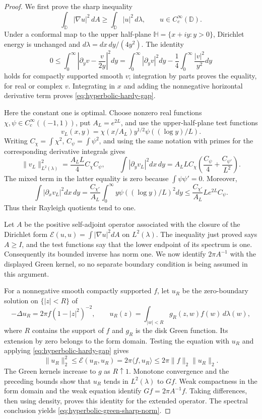\documentclass[11pt,a4paper]{article}
\numberwithin{equation}{section}
\theoremstyle{definition}
\theoremstyle{remark}
\begin{document}
\begin{proof}
We first prove the sharp inequality
\begin{equation}
 \int_{\mathbb D}|\nabla u|^2\,dA
 \ge \int_{\mathbb D}|u|^2\,d\lambda,
 \qquad u\in C_c^\infty(\mathbb D).
 \label{eq:hyperbolic-hardy-gap}
\end{equation}
Under a conformal map to the upper half-plane
$\mathbb H=\{x+iy:y>0\}$, Dirichlet energy is unchanged and
$d\lambda=dx\,dy/(4y^2)$.  The identity
\[
 0\le\int_0^\infty
       \left|\partial_y v-\frac{v}{2y}\right|^2dy
   =\int_0^\infty|\partial_y v|^2dy
      -\frac14\int_0^\infty\frac{|v|^2}{y^2}dy
\]
holds for compactly supported smooth $v$; integration by parts proves
the equality, for real or complex $v$.  Integrating in $x$ and adding
the nonnegative horizontal derivative term proves
\eqref{eq:hyperbolic-hardy-gap}.

Here the constant one is optimal.  Choose nonzero real functions
$\chi,\psi\in C_c^\infty((-1,1))$, put $A_L=e^{2L}$, and use the
upper-half-plane test functions
\[
 v_L(x,y)=\chi(x/A_L)y^{1/2}\psi((\log y)/L).
\]
Writing $C_\chi=\int\chi^2$, $C_\psi=\int\psi^2$, and using the same
notation with primes for the corresponding derivative integrals gives
\[
 \|v_L\|_{L^2(\lambda)}^2
       =\frac{A_LL}{4}C_\chi C_\psi,
 \qquad
 \int|\partial_yv_L|^2dx\,dy
       =A_LLC_\chi\left(\frac{C_\psi}{4}
                                      +\frac{C_{\psi'}}{L^2}\right).
\]
The mixed term in the latter equality is zero because
$\int\psi\psi'=0$.  Moreover,
\[
 \int|\partial_xv_L|^2dx\,dy
   =\frac{C_{\chi'}}{A_L}
       \int_0^\infty y\psi((\log y)/L)^2dy
   \le\frac{C_{\chi'}}{A_L}Le^{2L}C_\psi.
\]
Thus their Rayleigh quotients tend to one.

Let $A$ be the positive self-adjoint operator associated with the
closure of the Dirichlet form
$\mathcal E(u,u)=\int|\nabla u|^2dA$ on $L^2(\lambda)$.  The
inequality just proved says $A\ge I$, and the test functions say that
the lower endpoint of its spectrum is one.  Consequently its bounded
inverse has norm one.  We now identify $2\pi A^{-1}$ with the
displayed Green kernel, so no separate boundary condition is being
assumed in this argument.

For a nonnegative smooth compactly supported $f$, let $u_R$ be the
zero-boundary solution on $\{|z|<R\}$ of
\[
 -\Delta u_R=2\pi f(1-|z|^2)^{-2},
 \qquad
 u_R(z)=\int_{|w|<R}g_R(z,w)f(w)\,d\lambda(w),
\]
where $R$ contains the support of $f$ and $g_R$ is the disk Green
function.  Its extension by zero belongs to the form domain.
Testing the equation with $u_R$ and applying
\eqref{eq:hyperbolic-hardy-gap} gives
\[
 \|u_R\|_2^2\le\mathcal E(u_R,u_R)
       =2\pi\langle f,u_R\rangle
       \le2\pi\|f\|_2\|u_R\|_2.
\]
The Green kernels increase to $g$ as $R\uparrow1$.  Monotone
convergence and the preceding bounds show that $u_R$ tends in
$L^2(\lambda)$ to $Gf$.  Weak compactness in the form domain and the
weak equation identify $Gf=2\pi A^{-1}f$.  Taking differences,
then using density, proves this identity for the extended operator.
The spectral conclusion yields \eqref{eq:hyperbolic-green-sharp-norm}.


\end{proof}
\end{document}
